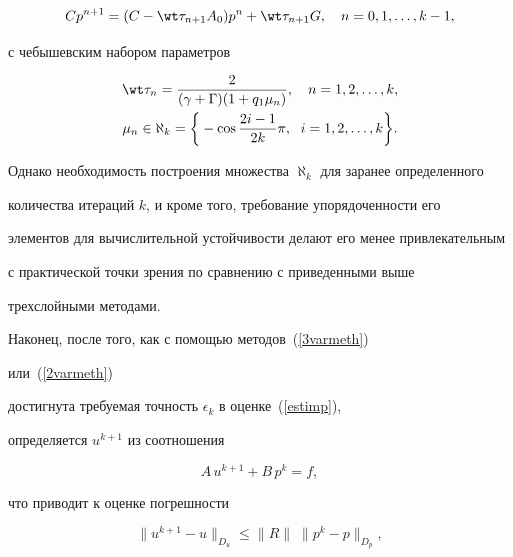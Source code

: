 \begin{equation}


\label{2varmeth}


C p^{n+1} = ( C - \wt \tau_{n+1} A_0)p^n +


\wt \tau_{n+1} G, \quad n = 0, 1, \dotsc, k-1,


\end{equation}


с чебышевским набором параметров


\begin{gather}


\label{2cheb}


\wt \tau_{n}=\frac2{(\gamma+\Gamma)(1+q_1\mu_n)},\quad n=1,2,\dotsc,k, \\


\mu_n \in \aleph_k = \bigg\{ - \cos \frac{2i -1}{2k} \pi,\ \;


i = 1, 2, \dotsc, k \bigg\}.\notag


\end{gather}


Однако необходимость построения множества $\aleph_k$ для заранее определенного


количества итераций $k$, и кроме того, требование упорядоченности его


элементов для вычислительной устойчивости делают его менее привлекательным


с практической точки зрения по сравнению с приведенными выше


трехслойными методами.





Наконец, после того, как с помощью методов~(\ref{3varmeth})


или~(\ref{2varmeth})


достигнута требуемая точность $\epsilon_k$ в оценке~(\ref{estimp}),


определяется $ u^{k+1} $ из соотношения


$$


A\,u^{k+1} + B\,p^k = f,


$$


что приводит к оценке погрешности


\begin{equation}


\label{estimu}


\| u^{k+1} - u \|_{D_u} \leq \| R \| \;\| p^k - p \|_{D_p},


\end{equation}


